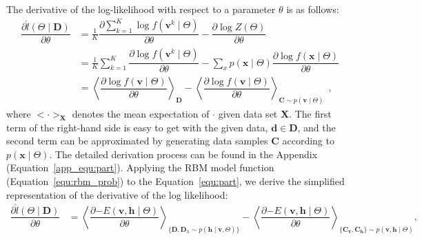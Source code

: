 The derivative of the log-likelihood with respect to a parameter $\theta$ is as follows:
\begin{equation}
\label{equ:part}
\begin{aligned}
\dfrac{\partial \hat{l} (\Theta \mid \mathbf{D})}{\partial \theta} 
& = \frac{1}{K} \dfrac{\partial \sum_{k=1}^K\log f(\mathbf{v}^k \mid \Theta )}{\partial \theta} - \dfrac{\partial \log Z( \Theta)}{\partial \theta}\\
& =  \frac{1}{K}\sum_{k=1}^K \dfrac{\partial \log f(\mathbf{v}^k \mid \Theta)}{\partial \theta} - \sum_x p(\mathbf{x} \mid \Theta) \dfrac{\partial \log f(\mathbf{x} \mid \Theta)}{\partial \theta}\\
& = \left \langle \dfrac{\partial \log f(\mathbf{v} \mid \Theta)}{\partial \theta}\right \rangle_{\mathbf{D}} -\left \langle \dfrac{\partial \log f(\mathbf{v} \mid \Theta)}{\partial \theta}\right \rangle_{\mathbf{C} \sim p(\mathbf{v} \mid \Theta)} ~~,
\end{aligned}
\end{equation}
where $ <\cdot>_{\mathbf{X}} $ denotes the mean expectation of $ \cdot $ given data set $\mathbf{X}$.
The first term of the right-hand side is easy to get with the given data, $\mathbf{d} \in \mathbf{D} $, and the second term can be approximated by generating data samples $\mathbf{C} $ according to $ p(\mathbf{x} \mid \Theta) $.
The detailed derivation process can be found in the Appendix (Equation~\ref{app_equ:part}).
Applying the RBM model function (Equation~\ref{equ:rbm_prob}) to the Equation~\ref{equ:part}, we derive the simplified representation of the derivative of the log likelihood:
\begin{equation}
\label{equ:RBM}
\begin{aligned}
\dfrac{\partial \hat{l} (\Theta \mid \mathbf{D})}{\partial \theta} 
& = \left \langle \dfrac{\partial {-E}(\mathbf{v}, \mathbf{h} \mid \Theta)}{\partial \theta} \right \rangle_{\{\mathbf{D}, \mathbf{D}_h \sim p( \mathbf{h} \mid \mathbf{v}, \Theta) \}} 
- \left \langle \dfrac{\partial {-E}(\mathbf{v}, \mathbf{h} \mid \Theta)}{\partial \theta} \right \rangle_{\{\mathbf{C_v}, \mathbf{C_h}\} \sim p( \mathbf{v}, \mathbf{h} \mid  \Theta)},
\end{aligned}
\end{equation}
